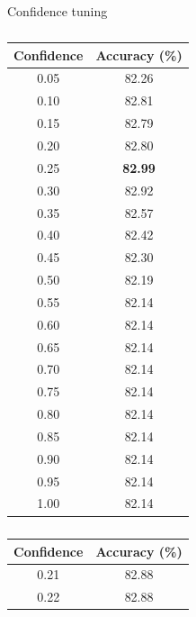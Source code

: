 \documentclass[12pt]{article}
\begin{document}
      \begin{table}[H]
          \caption{Confidence tuning}
          \begin{subtable}{.34\linewidth}
            \centering
            \caption{}
            \begin{tabular}{c|c}
              \toprule
              \multicolumn{1}{c|}{Confidence} & \multicolumn{1}{c}{Accuracy (\%)} \\
              \midrule
              0.05  & 82.26 \\
              0.10  & 82.81 \\
              0.15  & 82.79 \\
              0.20  & 82.80 \\
              0.25  & \textbf{82.99} \\
              0.30  & 82.92 \\
              0.35  & 82.57 \\
              0.40  & 82.42 \\
              0.45  & 82.30 \\
              0.50  & 82.19 \\
              0.55  & 82.14 \\
              0.60  & 82.14 \\
              0.65  & 82.14 \\
              0.70  & 82.14 \\
              0.75  & 82.14 \\
              0.80  & 82.14 \\
              0.85  & 82.14 \\
              0.90  & 82.14 \\
              0.95  & 82.14 \\
              1.00  & 82.14 \\
              \bottomrule
            \end{tabular}
            \label{tab:dt-con-a}
          \end{subtable}%
          \begin{subtable}{.34\linewidth}
            \centering
            \caption{}
            \begin{tabular}{c|c}
              \toprule
              \multicolumn{1}{c|}{Confidence} & \multicolumn{1}{c}{Accuracy (\%)} \\
              \midrule
              0.21  & 82.88 \\
              0.22  & 82.88 \\

\end{tabular}
\end{subtable}
\end{table}
\end{document}
